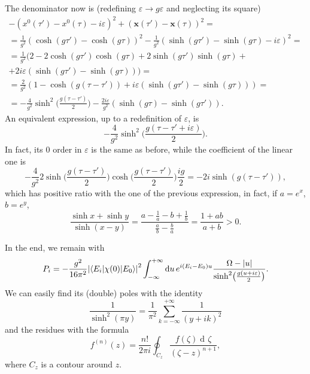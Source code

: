 \documentclass[a4paper,12pt]{book}
\newcommand{\ap}[1]{\textormath{\textsuperscript{#1}}{^{\mathrm{#1}}}}
\DeclarePairedDelimiter{\abs}{\lvert}{\rvert}
\renewcommand{\vec}{\mathbf}
\newcommand{\dd}{\mathop{\mathrm{d}\!}{}}
\renewcommand{\epsilon}{\varepsilon}
\theoremstyle{definition}
\theoremstyle{remark}
\begin{document}
The denominator now is (redefining $\epsilon\to g\epsilon$ and neglecting its square)
\begin{multline*}
-(x^0(\tau')-x^0(\tau)-i\epsilon)^2+(\vec x(\tau')-\vec x(\tau))^2=\\
=\frac1{g^2}(\cosh(g\tau')-\cosh(g\tau))^2-\frac1{g^2}(\sinh(g\tau')-\sinh(g\tau)-i\epsilon)^2=\\
=\frac1{g^2}(2-2\cosh(g\tau')\cosh(g\tau)+2\sinh(g\tau')\sinh(g\tau)+\\
+2i\epsilon(\sinh(g\tau')-\sinh(g\tau)))=\\
=\frac2{g^2}(1-\cosh(g(\tau-\tau'))+i\epsilon(\sinh(g\tau')-\sinh(g\tau)))=\\
=-\frac4{g^2}\sinh^2\biggl(\frac{g(\tau-\tau')}{2}\biggr)-\frac{2i\epsilon}{g^2}(\sinh(g\tau)-\sinh(g\tau')).
\end{multline*}
An equivalent expression, up to a redefinition of $\epsilon$, is
\[-\frac4{g^2}\sinh^2\biggl(\frac{g(\tau-\tau'+i\epsilon)}2\biggr).\]
In fact, its 0\ap{th} order in $\epsilon$ is the same as before, while the coefficient of the linear one is
\[-\frac4{g^2}2\sinh\biggl(\frac{g(\tau-\tau')}2\biggr)\cosh\biggl(\frac{g(\tau-\tau')}2\biggr)\frac{ig}2=-2i\sinh(g(\tau-\tau')),\]
which has positive ratio with the one of the previous expression, in fact, if $a=e^x$, $b=e^y$,
\[\frac{\sinh x+\sinh y}{\sinh(x-y)}=\frac{a-\frac1a-b+\frac1b}{\frac ab-\frac ba}=\frac{1+ab}{a+b}>0.\]

In the end, we remain with
\[P_i=-\frac{g^2}{16\pi^2}\abs*{\braket{E_i|\chi(0)|E_0}}^2\int_{-\infty}^{+\infty}\dd u\,e^{i(E_i-E_0)u}\frac{\Omega-\abs{u}}{\sinh^2\bigl(\frac{g(u+i\epsilon)}2\bigr)}.\]
We can easily find its (double) poles with the identity
\[\frac1{\sinh^2(\pi y)}=\frac1{\pi^2}\sum_{k=-\infty}^{+\infty}\frac1{(y+ik)^2}\]
and the residues with the formula
\[f^{(n)}(z)=\frac{n!}{2\pi i}\oint_{C_z}\frac{f(\zeta)\dd\zeta}{(\zeta-z)^{n+1}},\]
where $C_z$ is a contour around $z$.
\end{document}

